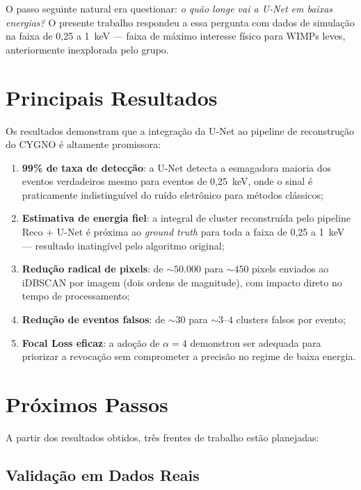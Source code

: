 \documentclass[
       oneside,
       english,
       brazil
       ]{abntbibufjf}
\begin{document}
O passo seguinte natural era questionar: \textit{o quão longe vai a U-Net em
baixas energias?} O presente trabalho respondeu a essa pergunta com dados de
simulação na faixa de 0,25 a 1~keV — faixa de máximo interesse físico para
WIMPs leves, anteriormente inexplorada pelo grupo.

\section{Principais Resultados}
\label{sec:main_results}

Os resultados demonstram que a integração da U-Net ao pipeline de
reconstrução do CYGNO é altamente promissora:
\begin{enumerate}
    \item \textbf{99\% de taxa de detecção}: a U-Net detecta a esmagadora
    maioria dos eventos verdadeiros mesmo para eventos de 0,25~keV, onde o
    sinal é praticamente indistinguível do ruído eletrônico para métodos
    clássicos;
    \item \textbf{Estimativa de energia fiel}: a integral de cluster
    reconstruída pelo pipeline Reco + U-Net é próxima ao \textit{ground truth}
    para toda a faixa de 0,25 a 1~keV — resultado inatingível pelo algoritmo
    original;
    \item \textbf{Redução radical de pixels}: de ${\sim}50{.}000$ para
    ${\sim}450$ pixels enviados ao iDBSCAN por imagem (dois ordens de
    magnitude), com impacto direto no tempo de processamento;
    \item \textbf{Redução de eventos falsos}: de ${\sim}30$ para
    ${\sim}3$--$4$ clusters falsos por evento;
    \item \textbf{Focal Loss eficaz}: a adoção de $\alpha = 4$ demonstrou ser
    adequada para priorizar a revocação sem comprometer a precisão no regime
    de baixa energia.
\end{enumerate}

\section{Próximos Passos}
\label{sec:next_steps}

A partir dos resultados obtidos, três frentes de trabalho estão planejadas:

\subsection{Validação em Dados Reais}
\end{document}
